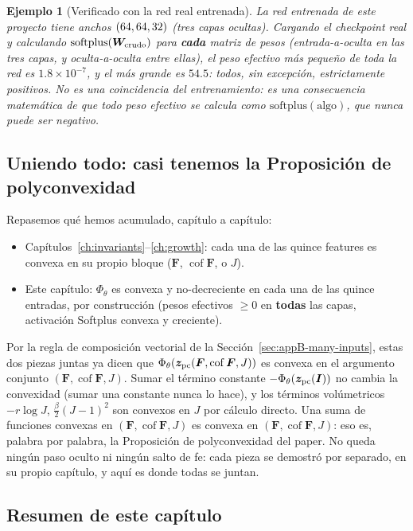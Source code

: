 \documentclass[11pt,a4paper]{article}
\newtheorem{ejemplo}{Ejemplo}
\newcommand{\Cof}{\operatorname{cof}}
\begin{document}
\begin{ejemplo}[Verificado con la red real entrenada]
\label{ex:appB-icnn-weights}
La red entrenada de este proyecto tiene anchos $(64,64,32{})$
(tres capas ocultas). Cargando el checkpoint real y calculando
$\mathrm{softplus}(\bm W_{\rm crudo})$ para \textbf{cada} matriz de
pesos (entrada-a-oculta en las tres capas, y oculta-a-oculta entre
ellas), el peso efectivo m\'as peque\~no de toda la red es
$1.8\times10^{-7}$, y el m\'as grande es $54.5$: todos, sin excepci\'on,
estrictamente positivos. No es una coincidencia del entrenamiento: es
una consecuencia matem\'atica de que todo peso efectivo se calcula como
$\mathrm{softplus}(\text{algo})$, que nunca puede ser negativo.
\end{ejemplo}

\subsection{Uniendo todo: casi tenemos la Proposici\'on de polyconvexidad}

Repasemos qu\'e hemos acumulado, cap\'itulo a cap\'itulo:
\begin{itemize}
\item Cap\'itulos~\ref{ch:invariants}--\ref{ch:growth}: cada una de las
quince features es convexa en su propio bloque ($\bm F$, $\Cof\bm F$, o
$J$).
\item Este cap\'itulo: $\Phi_\theta$ es convexa y no-decreciente en cada
una de las quince entradas, por construcci\'on (pesos efectivos
$\geq0$ en \textbf{todas} las capas, activaci\'on Softplus convexa y
creciente).
\end{itemize}
Por la regla de composici\'on vectorial de la
Secci\'on~\ref{sec:appB-many-inputs}, estas dos piezas juntas ya dicen
que $\Phi_\theta(\bm z_{\rm pc}(\bm F,\Cof\bm F,J))$ es convexa en el
argumento conjunto $(\bm F,\Cof\bm F,J)$. Sumar el t\'ermino
constante $-\Phi_\theta(\bm z_{\rm pc}(\bm I))$ no cambia la convexidad
(sumar una constante nunca lo hace), y los t\'erminos vol\'umetricos
$-r\log J$, $\tfrac\beta2(J-1)^2$ son convexos en $J$ por c\'alculo
directo. Una suma de funciones convexas en $(\bm F,\Cof\bm F,J)$ es
convexa en $(\bm F,\Cof\bm F,J)$: eso es, palabra por palabra, la
Proposici\'on de polyconvexidad del paper. No queda ning\'un paso
oculto ni ning\'un salto de fe: cada pieza se demostr\'o por separado,
en su propio cap\'itulo, y aqu\'i es donde todas se juntan.

\subsection{Resumen de este cap\'itulo}
\end{document}
